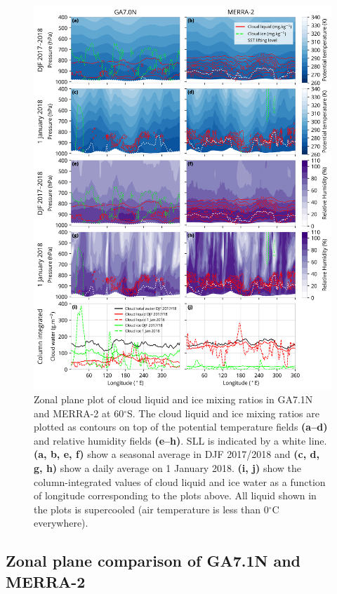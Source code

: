 \begin{figure}[p]
\centering
\includegraphics[width=\textwidth]{chapter2/fig/zone_panel_rev2.png}
\caption[Zonal plane plot of cloud liquid and ice mixing ratios in GA7.1N and MERRA-2 at
60$^\circ$S]{
Zonal plane plot of cloud liquid and ice mixing ratios in GA7.1N and MERRA-2 at
60$^\circ$S. The cloud liquid and ice mixing ratios are plotted as contours on
top of the potential temperature fields \textbf{(a--d)} and relative humidity
fields \textbf{(e--h)}. SLL is indicated by a white line. \textbf{(a, b, e, f)}
show a seasonal average in DJF 2017/2018 and \textbf{(c, d, g, h)}
show a daily average on 1 January 2018. \textbf{(i, j)} show the
column-integrated values of cloud liquid and ice water as a function of
longitude corresponding to the plots above. All liquid shown in the plots
is supercooled (air temperature is less than 0$^\circ$C everywhere).
}
\label{fig:2:zone-panel}
\end{figure}

\subsection{Zonal plane comparison of GA7.1N and MERRA-2}
\label{sec:2:zonal-plane-comparison}

